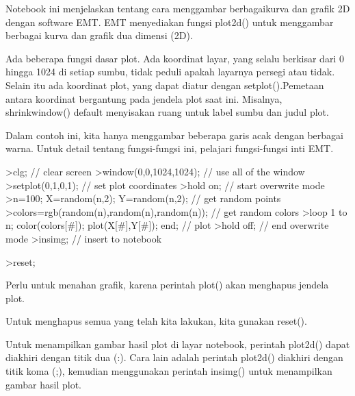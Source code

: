 \documentclass[a4paper,10pt]{article}
\begin{document}
\begin{eulernotebook}
\begin{eulercomment}
\begin{eulercomment}
\begin{eulercomment}
\begin{eulercomment}
\begin{eulercomment}
\begin{eulercomment}
\begin{eulercomment}
\begin{eulercomment}
\begin{eulercomment}
Notebook ini menjelaskan tentang cara menggambar berbagaikurva dan
grafik 2D dengan software EMT. EMT menyediakan fungsi plot2d() untuk
menggambar berbagai kurva dan grafik dua dimensi (2D).\\
\end{eulercomment}
\begin{eulercomment}
Ada beberapa fungsi dasar plot. Ada koordinat layar, yang selalu
berkisar dari 0 hingga 1024 di setiap sumbu, tidak peduli apakah
layarnya persegi atau tidak. Selain itu ada koordinat plot, yang dapat
diatur dengan setplot().Pemetaan antara koordinat bergantung pada
jendela plot saat ini. Misalnya, shrinkwindow() default menyisakan
ruang untuk  label sumbu dan judul plot.

Dalam contoh ini, kita hanya menggambar beberapa garis acak dengan
berbagai warna. Untuk detail tentang fungsi-fungsi ini, pelajari
fungsi-fungsi inti EMT.
\end{eulercomment}
\begin{eulerprompt}
>clg; // clear screen
>window(0,0,1024,1024); // use all of the window
>setplot(0,1,0,1); // set plot coordinates
>hold on; // start overwrite mode
>n=100; X=random(n,2); Y=random(n,2);  // get random points
>colors=rgb(random(n),random(n),random(n)); // get random colors
>loop 1 to n; color(colors[#]); plot(X[#],Y[#]); end; // plot
>hold off; // end overwrite mode
>insimg; // insert to notebook
\end{eulerprompt}
\begin{eulerprompt}
>reset;
\end{eulerprompt}
\begin{eulercomment}
Perlu untuk menahan grafik, karena perintah plot() akan menghapus
jendela plot.

Untuk menghapus semua yang telah kita lakukan, kita gunakan reset().

Untuk menampilkan gambar hasil plot di layar notebook, perintah
plot2d() dapat diakhiri dengan titik dua (:). Cara lain adalah
perintah plot2d() diakhiri dengan titik koma (;), kemudian menggunakan
perintah insimg() untuk menampilkan gambar hasil plot.


\end{eulercomment}
\end{eulercomment}
\end{eulercomment}
\end{eulercomment}
\end{eulercomment}
\end{eulercomment}
\end{eulercomment}
\end{eulercomment}
\end{eulercomment}
\end{eulernotebook}
\end{document}
